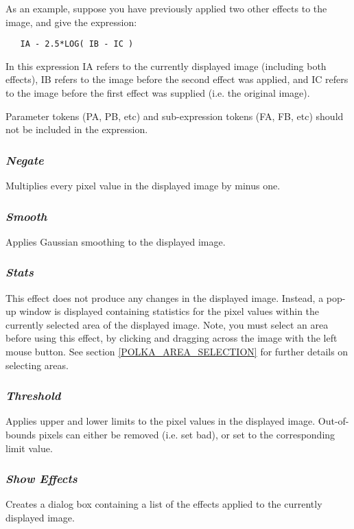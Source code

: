 \documentclass[11pt]{article}
\newcommand{\hyperref}[4]{#2\ref{#4}#3}
\newcommand{\xlabel}[1]{}
\newcommand{\mylabel}[1] {\xlabel{#1}\label{#1}}
\begin{document}
As an example, suppose you have previously applied two other effects to
the image, and give the expression:

\begin{verbatim}
   IA - 2.5*LOG( IB - IC )
\end{verbatim}

In this expression IA refers to the currently displayed image (including
both effects), IB refers to the image before the second effect was
applied, and IC refers to the image before the first effect was supplied
(i.e. the original image).

Parameter tokens (PA, PB, etc) and sub-expression tokens (FA, FB, etc) should
not be included in the expression.

\subsubsection {\mylabel{POLKA_NEGATE_EFFECT}\emph{Negate} }
Multiplies every pixel value in the displayed image by minus one.

\subsubsection {\mylabel{POLKA_SMOOTH_EFFECT}\emph{Smooth} }
Applies Gaussian smoothing to the displayed image.

\subsubsection {\mylabel{POLKA_STATS_EFFECT}\emph{Stats} }
This effect does not produce any changes in the displayed image. Instead,
a pop-up window is displayed containing statistics for the pixel values
within the currently selected area of the displayed image. Note, you must
select an area before using this effect, by clicking and dragging across
the image with the left mouse button. \hyperref{Go here}{See section
}{}{POLKA_AREA_SELECTION} for further details on selecting areas.

\subsubsection {\mylabel{POLKA_THRESHOLD_EFFECT}\emph{Threshold} }
Applies upper and lower limits to the pixel values in the displayed image.
Out-of-bounds pixels can either be removed (i.e. set bad), or set to the
corresponding limit value.

\subsubsection {\mylabel{POLKA_SHOW_EFFECTS}\emph{Show Effects} }
Creates a dialog box containing a list of the effects applied to the
currently displayed image.
\end{document}
